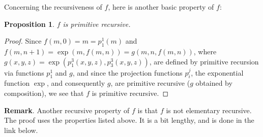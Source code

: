 \documentclass[12pt]{article}
\newtheorem{prop}{Proposition}
\begin{document}
Concerning the recursiveness of $f$, here is another basic property of $f$:
\begin{prop} $f$ is primitive recursive. \end{prop}
\begin{proof}
Since $f(m,0)=m=p_1^1(m)$ and $f(m,n+1)=\exp(m,f(m,n))=g(m,n,f(m,n))$, where $g(x,y,z)=\exp(p_1^3(x,y,z),p_3^3(x,y,z))$, are defined by primitive recursion via functions $p_1^1$ and $g$, and since the projection functions $p_i^j$, the exponential function $\exp$, and consequently $g$, are primitive recursive ($g$ obtained by composition), we see that $f$ is primitive recursive.
\end{proof}

\textbf{Remark}.  Another recursive property of $f$ is that $f$ is not elementary recursive.  The proof uses the properties listed above.  It is a bit lengthy, and is done in the link below.
\end{document}
